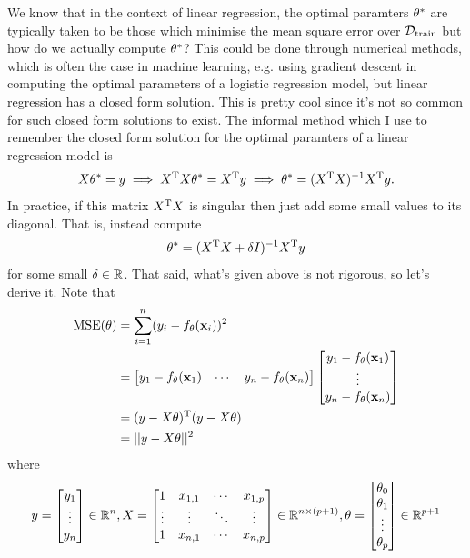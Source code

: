 \documentclass[11pt]{article}
\begin{document}
\noindent We know that in the context of linear regression, the optimal paramters $\theta^{*}$ are typically taken to be those which minimise the mean square error over $\mathcal{D}_{\text{train}}$ but how do we actually compute $\theta^{*}$? This could be done through numerical methods, which is often the case in machine learning, e.g. using gradient descent in computing the optimal parameters of a logistic regression model, but linear regression has a closed form solution. This is pretty cool since it's not so common for such closed form solutions to exist. The informal method which I use to remember the closed form solution for the optimal paramters of a linear regression model is
$$
X\theta^{*}=y \implies X^{\text{T}}X\theta^{*}=X^{\text{T}}y \implies \theta^{*}=(X^{\text{T}}X)^{-1}X^{\text{T}}y.
$$
In practice, if this matrix $X^{\text{T}}X$ is singular then just add some small values to its diagonal. That is, instead compute
$$
\theta^{*}=(X^{\text{T}}X+\delta I)^{-1}X^{\text{T}}y
$$
for some small $\delta\in\mathbb{R}$. That said, what's given above is not rigorous, so let's derive it. Note that
\begin{align*}
    \text{MSE}(\theta)
    &=
    \sum_{i=1}^n(y_i-f_{\theta}(\mathbf{x}_i))^2\\
    &=
    \begin{bmatrix}
        y_1-f_{\theta}(\mathbf{x}_1) & \cdots & y_n-f_{\theta}(\mathbf{x}_n)
    \end{bmatrix}
    \begin{bmatrix}
        y_1-f_{\theta}(\mathbf{x}_1)\\
        \vdots\\
        y_n-f_{\theta}(\mathbf{x}_n)
    \end{bmatrix}\\
    &=(y-X\theta)^{\text{T}}(y-X\theta)\\
    &=||y-X\theta||^2
\end{align*}
where
$$
y
=
\begin{bmatrix}
    y_1\\
    \vdots\\
    y_n
\end{bmatrix}
\in\mathbb{R}^n,
X
=
\begin{bmatrix}
    1 & x_{1,1} & \cdots & x_{1,p}\\
    \vdots & \vdots & \ddots & \vdots\\
    1 & x_{n,1} & \cdots & x_{n,p}
\end{bmatrix}
\in\mathbb{R}^{n\times (p+1)},
\theta
=
\begin{bmatrix}
    \theta_0\\
    \theta_1\\
    \vdots\\
    \theta_p
\end{bmatrix}
\in\mathbb{R}^{p+1}
$$
\end{document}
